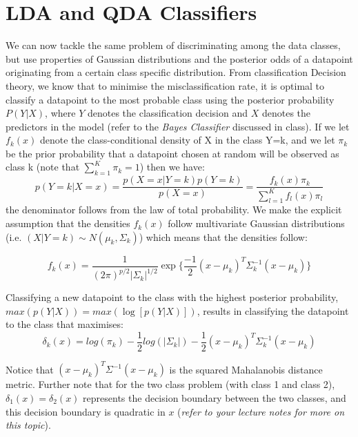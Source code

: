 \documentclass{article}
\begin{document}

\section{LDA and QDA Classifiers}
We can now tackle the same problem of discriminating among the data classes, but use properties of Gaussian distributions and the posterior odds of a datapoint originating from a certain class specific distribution. From classification Decision theory, we know that to minimise the misclassification rate, it is optimal to classify a datapoint to the most probable class using the posterior probability $P(Y|X)$, where $Y$ denotes the classification decision and $X$ denotes the predictors in the model (refer to the \textit{Bayes Classifier} discussed in class). If we let $f_k(x)$ denote the class-conditional density of X in the class Y=k, and we let $\pi_k$ be the prior probability that a datapoint chosen at random will be observed as class k (note that $\sum_{k=1}^K \pi_k = 1$) then we have:
$$
p(Y=k|X=x) = \frac{p(X=x|Y=k)p(Y=k)}{p(X=x)} = \frac{f_k(x) \pi_k}{\sum_{l=1}^K f_l(x) \pi_l}
$$
the denominator follows from the law of total probability. We make the explicit assumption that the densities $f_k(x)$ follow multivariate Gaussian distributions (i.e. $(X|Y=k) \sim N(\mu_k, \Sigma_k)$) which means that the densities follow:

$$
f_k(x) = \frac{1}{(2\pi)^{p/2} \vert \Sigma_k \vert ^{1/2} } \exp \big \{\frac{-1}{2}(x - \mu_k)^T \Sigma_k^{-1} (x - \mu_k) \big \}
$$

Classifying a new datapoint to the class with the highest posterior probability, $max(p(Y|X)) = max(\log [p(Y|X)])$, results in classifying the datapoint to the class that maximises:
$$
\delta_k(x) = log(\pi_k) - \frac{1}{2}log(\vert \Sigma_k \vert) - \frac{1}{2}(x - \mu_k)^T \Sigma_k^{-1} (x - \mu_k)
$$

Notice that $(x - \mu_k)^T \Sigma^{-1} (x - \mu_k)$ is the squared Mahalanobis distance metric. Further note that for the two class problem (with class 1 and class 2), $\delta_1(x) = \delta_2(x)$ represents the decision boundary between the two classes, and this decision boundary is quadratic in $x$ (\textit{refer to your lecture notes for more on this topic}).
\end{document}
